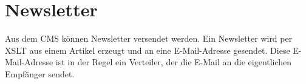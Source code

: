 %

\chapter{Newsletter} \label{sec-newsletter}

Aus dem CMS können Newsletter versendet werden. Ein Newsletter wird per XSLT aus
einem Artikel erzeugt und an eine E-Mail-Adresse gesendet. Diese E-Mail-Adresse
ist in der Regel ein Verteiler, der die E-Mail an die eigentlichen Empfänger
sendet.
